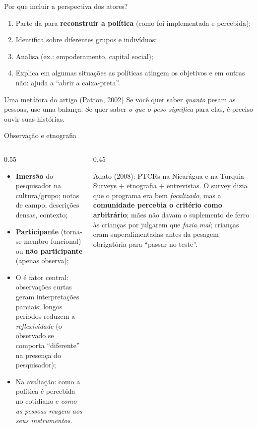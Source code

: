 \begin{frame}{Por que incluir a perspectiva dos atores?}
  \begin{enumerate}
    \item Parte da  para \textbf{reconstruir a política} (como foi implementada e percebida);
    \item Identifica  sobre diferentes grupos e indivíduos;
    \item Analisa  (ex.: empoderamento, capital social);
    \item Explica  em algumas situações as políticas atingem os objetivos e em outras não: ajuda a ``abrir a caixa-preta''.
  \end{enumerate}
  \vspace{0.3cm}
  \begin{block}{Uma metáfora do artigo (Patton, 2002)}
    \small Se você quer saber \emph{quanto} pesam as pessoas, use uma balança. Se quer saber \emph{o que o peso significa} para elas, é preciso ouvir suas histórias.
  \end{block}
\end{frame}

\begin{frame}{Observação e etnografia}
  \begin{columns}[T]
    \begin{column}{0.55\textwidth}
      \small
      \begin{itemize}
        \item \textbf{Imersão} do pesquisador na cultura/grupo; notas de campo, descrições densas, contexto;
        \item \textbf{Participante} (torna-se membro funcional) ou \textbf{não participante} (apenas observa);
        \item O  é fator central: observações curtas geram interpretações parciais; longos períodos reduzem a \emph{reflexividade} (o observado se comporta ``diferente'' na presença do pesquisador);
        \item Na avaliação: como a política é percebida no cotidiano e \emph{como as pessoas reagem aos seus instrumentos}.
      \end{itemize}
    \end{column}
    \begin{column}{0.45\textwidth}
      \begin{block}{Adato (2008): PTCRs na Nicarágua e na Turquia}
        \footnotesize
        Surveys + etnografia + entrevistas. O survey dizia que o programa era bem \emph{focalizado}, mas a \textbf{comunidade percebia o critério como arbitrário}; mães não davam o suplemento de ferro às crianças por julgarem que \emph{fazia mal}; crianças eram superalimentadas antes da pesagem obrigatória para ``passar no teste''.
      \end{block}
    \end{column}
  \end{columns}
\end{frame}

